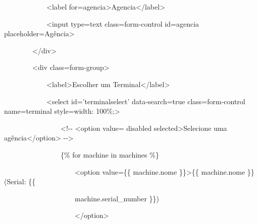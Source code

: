 {\ttfamily\color[rgb]{0.10980392,0.10980392,0.10980392}
    \ \ \ \ \ \ \ \ \ \ \ \ {\textless}label
        for={\textquotedbl}agencia{\textquotedbl}{\textgreater}Agencia{\textless}/label{\textgreater}}

{\ttfamily\color[rgb]{0.10980392,0.10980392,0.10980392}
    \ \ \ \ \ \ \ \ \ \ \ \ {\textless}input type={\textquotedbl}text{\textquotedbl}
    class={\textquotedbl}form-control{\textquotedbl} id={\textquotedbl}agencia{\textquotedbl}
    placeholder={\textquotedbl}Ag\^encia{\textquotedbl}{\textgreater}}

{\ttfamily\color[rgb]{0.10980392,0.10980392,0.10980392}
    \ \ \ \ \ \ \ \ {\textless}/div{\textgreater}}

{\ttfamily\color[rgb]{0.10980392,0.10980392,0.10980392}
    \ \ \ \ \ \ \ \ {\textless}div class={\textquotedbl}form-group{\textquotedbl}{\textgreater}}

{\ttfamily\color[rgb]{0.10980392,0.10980392,0.10980392}
    \ \ \ \ \ \ \ \ \ \ \ \ {\textless}label{\textgreater}Escolher um Terminal{\textless}/label{\textgreater}}

{\ttfamily\color[rgb]{0.10980392,0.10980392,0.10980392}
    \ \ \ \ \ \ \ \ \ \ \ \ {\textless}select id='terminalselect' data-search={\textquotedbl}true{\textquotedbl}
    class={\textquotedbl}form-control{\textquotedbl} name={\textquotedbl}terminal{\textquotedbl}
    style={\textquotedbl}width: 100\%;{\textquotedbl}{\textgreater}}

{\ttfamily\color[rgb]{0.10980392,0.10980392,0.10980392}
    \ \ \ \ \ \ \ \ \ \ \ \ \ \ \ \ {\textless}!-{}- {\textless}option value={\textquotedbl}{\textquotedbl} disabled
        selected{\textgreater}Selecione uma ag\^encia{\textless}/option{\textgreater} -{}-{\textgreater}}

{\ttfamily\color[rgb]{0.10980392,0.10980392,0.10980392}
    \ \ \ \ \ \ \ \ \ \ \ \ \ \ \ \ \{\% for machine in machines \%\}}

{\ttfamily\color[rgb]{0.10980392,0.10980392,0.10980392}
    \ \ \ \ \ \ \ \ \ \ \ \ \ \ \ \ \ \ \ \ {\textless}option value={\textquotedbl}\{\{ machine.nome
        \}\}{\textquotedbl}{\textgreater}\{\{ machine.nome \}\} (Serial: \{\{}

                {\ttfamily\color[rgb]{0.10980392,0.10980392,0.10980392}
                \ \ \ \ \ \ \ \ \ \ \ \ \ \ \ \ \ \ \ \ machine.serial\_number \}\})}

{\ttfamily\color[rgb]{0.10980392,0.10980392,0.10980392}
    \ \ \ \ \ \ \ \ \ \ \ \ \ \ \ \ \ \ \ \ {\textless}/option{\textgreater}}


